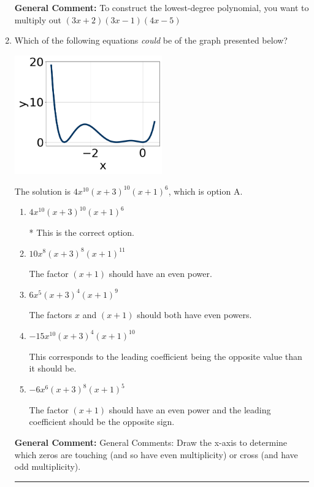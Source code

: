 \documentclass{extbook}[14pt]
\newcommand{\litem}[1]{\item #1

\rule{\textwidth}{0.4pt}}
\begin{document}
\begin{enumerate}
{\textbf{General Comment:} To construct the lowest-degree polynomial, you want to multiply out $(3x + 2)(3x -1)(4x -5)$
}
\litem{
Which of the following equations \textit{could} be of the graph presented below?

\begin{center}
    \includegraphics[width=0.5\textwidth]{../Figures/polyGraphToFunctionB.png}
\end{center}


The solution is \( 4x^{10} (x + 3)^{10} (x + 1)^{6} \), which is option A.\begin{enumerate}[label=\Alph*.]
\item \( 4x^{10} (x + 3)^{10} (x + 1)^{6} \)

* This is the correct option.
\item \( 10x^{8} (x + 3)^{8} (x + 1)^{11} \)

The factor $(x + 1)$ should have an even power.
\item \( 6x^{5} (x + 3)^{4} (x + 1)^{9} \)

The factors $x$ and $(x + 1)$ should both have even powers.
\item \( -15x^{10} (x + 3)^{4} (x + 1)^{10} \)

This corresponds to the leading coefficient being the opposite value than it should be.
\item \( -6x^{6} (x + 3)^{8} (x + 1)^{5} \)

The factor $(x + 1)$ should have an even power and the leading coefficient should be the opposite sign.
\end{enumerate}

\textbf{General Comment:} General Comments: Draw the x-axis to determine which zeros are touching (and so have even multiplicity) or cross (and have odd multiplicity).
}
\end{enumerate}
\end{document}
